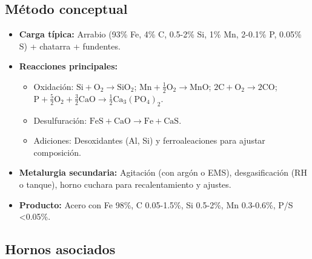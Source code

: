 \documentclass[12pt,a4paper]{article}
\begin{document}
\subsection{Método conceptual}

\begin{itemize}
    \item \textbf{Carga típica:} Arrabio (93\% Fe, 4\% C, 0.5-2\% Si, 1\% Mn, 2-0.1\% P, 0.05\% S) + chatarra + fundentes.
    \item \textbf{Reacciones principales:}
    \begin{itemize}
        \item Oxidación: $\mathrm{Si} + \mathrm{O}_2 \to \mathrm{SiO}_2$; $\mathrm{Mn} + \frac{1}{2}\mathrm{O}_2 \to \mathrm{MnO}$; $2\mathrm{C} + \mathrm{O}_2 \to 2\mathrm{CO}$; $\mathrm{P} + \frac{5}{2}\mathrm{O}_2 + \frac{3}{2}\mathrm{CaO} \to \frac{1}{2}\mathrm{Ca}_3(\mathrm{PO}_4)_2$.
        \item Desulfuración: $\mathrm{FeS} + \mathrm{CaO} \to \mathrm{Fe} + \mathrm{CaS}$.
        \item Adiciones: Desoxidantes (Al, Si) y ferroaleaciones para ajustar composición.
    \end{itemize}
    \item \textbf{Metalurgia secundaria:} Agitación (con argón o EMS), desgasificación (RH o tanque), horno cuchara para recalentamiento y ajustes.
    \item \textbf{Producto:} Acero con Fe 98\%, C 0.05-1.5\%, Si 0.5-2\%, Mn 0.3-0.6\%, P/S <0.05\%.
\end{itemize}

\subsection{Hornos asociados}

\begin{table}[h]
    \centering
    \caption{Comparación de Hornos para Acero}
\end{table}
\end{document}
